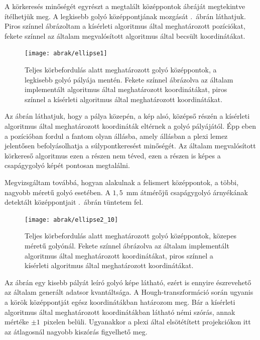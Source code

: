 \documentclass[a4paper,12pt]{article}
\begin{document}
A körkeresés minőségét egyrészt a megtalált középpontok ábráját megtekintve ítélhetjük meg. A legkisebb golyó  középpontjának mozgását .~ábrán láthatjuk. Piros színnel ábrázoltam a kísérleti algoritmus által meghatározott pozíciókat, fekete színnel az általam megvalósított algoritmus által becsült koordinátákat.




\begin{figure}[htbp]
\center
\texttt{[image: abrak/ellipse1]}
\caption{Teljes körbefordulás alatt meghatározott golyó középpontok, a legkisebb golyó pályája  mentén. Fekete színnel ábrázolva az általam implementált algoritmus által meghatározott koordinátákat, piros színnel a kísérleti algoritmus által meghatározott koordinátákat.}
\label{fig:ellipseskicsi}
\end{figure}


 Az ábrán láthatjuk, hogy a pálya közepén, a kép alsó, középső részén a kísérleti algoritmus által meghatározott koordináták eltérnek a golyó pályájától. Épp eben a pozícióban fordul a fantom olyan állásba, amely állásban a plexi lemez jelentősen befolyásolhatja a súlypontkeresést minőségét. Az általam megvalósított körkereső algoritmus ezen a részen nem téved, ezen a részen is képes a csapágygolyó képét pontosan megtalálni.
 
 
 Megvizsgáltam továbbá, hogyan alakulnak a felismert középpontok, a többi, nagyobb méretű golyó esetében. A $1,\!5$~mm átmérőjű csapágygolyó árnyékának detektált középpontjait .~ábrán tüntetem fel. 




\begin{figure}[htbp]
\center
\texttt{[image: abrak/ellipse2\_10]}
\caption{Teljes körbefordulás alatt meghatározott golyó középpontok, közepes méretű golyónál. Fekete színnel ábrázolva az általam implementált algoritmus által meghatározott koordinátákat, piros színnel a kísérleti algoritmus által meghatározott koordinátákat.}
\label{fig:ellipses2_10}
\end{figure}




Az ábrán egy kisebb pályát leíró golyó képe látható, ezért is ennyire észrevehető az általam generált adatsor kvantáltsága. A Hough-transzformáció során ugyanis a körök középpontját egész koordinátákban határozom meg. Bár a kísérleti algoritmus által meghatározott koordinátákban látható némi szórás, annak mértéke $\pm 1$~pixelen belüli. Ugyanakkor a plexi által elsötétített projekciókon itt az átlagosnál nagyobb kiszórás figyelhető meg.
\end{document}
